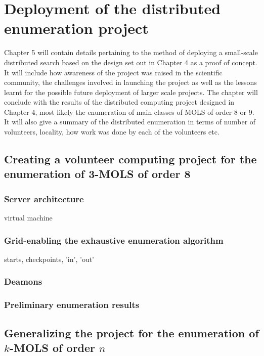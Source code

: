 \chapter{Deployment of the distributed enumeration project}
\vspace{-2em}
\minitoc

Chapter 5 will contain details pertaining to the method of deploying a small-scale distributed search based on the design set out in Chapter 4 as a proof of concept.  It will include how awareness of the project was raised in the scientific community, the  challenges involved in launching the project as well as the lessons learnt for the possible future deployment of larger scale projects.  The chapter will conclude with the results of the distributed computing project designed in Chapter 4, most likely the enumeration of main classes of MOLS of order 8 or 9.  It will also give a summary of the distributed enumeration in terms of number of volunteers, locality, how work was done by each of the volunteers etc. 



\section{Creating a volunteer computing project for the enumeration of 3-MOLS of order 8}
\subsection{Server architecture}
virtual machine
\subsection{Grid-enabling the exhaustive enumeration algorithm}
starts, checkpoints, 'in', 'out'
\subsection{Deamons}
\subsection{Preliminary enumeration results}


\section{Generalizing the project for the enumeration of $k$-MOLS of order $n$}
